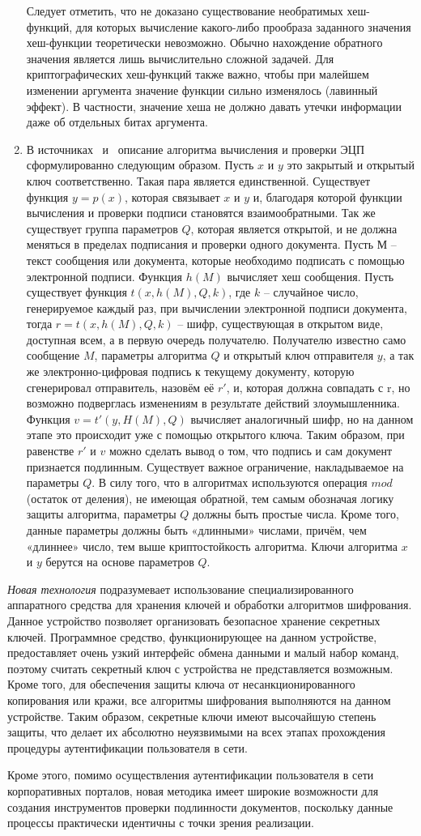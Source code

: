 \begin{enumerate}
Следует отметить, что не доказано существование необратимых хеш-функций, для
которых вычисление какого-либо прообраза заданного значения хеш-функции
теоретически невозможно. Обычно нахождение обратного значения является лишь
вычислительно сложной задачей.
Для криптографических хеш-функций также важно, чтобы при малейшем изменении
аргумента значение функции сильно изменялось (лавинный эффект). В частности,
значение хеша не должно давать утечки информации даже об отдельных битах
аргумента.~\cite{barichev}
  \item В источниках~\cite{GOST_P341094} и~\cite{ECP} описание алгоритма
  вычисления и проверки ЭЦП сформулированно следующим образом.
Пусть $x$ и $y$ это закрытый и открытый ключ соответственно. Такая пара является
единственной. Существует функция $y=p(x)$, которая связывает $x$ и $y$ и,
благодаря которой функции вычисления и проверки подписи становятся взаимообратными. Так же
существует группа параметров $Q$, которая является открытой, и не должна
меняться в пределах подписания и проверки одного документа. Пусть М -- текст
сообщения или документа, которые необходимо подписать с помощью электронной
подписи. Функция $h(M)$ вычисляет хеш сообщения. Пусть существует функция $t(x,
h(M), Q, k)$, где $k$ -- случайное число, генерируемое каждый раз, при
вычислении электронной подписи документа, тогда $r = t(x, h(M), Q, k)$ -- шифр,
существующая в открытом виде, доступная всем, а в первую очередь получателю.
Получателю известно само сообщение $M$, параметры алгоритма $Q$ и открытый ключ
отправителя $y$, а так же электронно-цифровая подпись к текущему документу,
которую сгенерировал отправитель,  назовём её $r'$, и, которая должна совпадать
с r, но возможно подверглась изменениям в результате действий злоумышленника.
Функция $v=t'(y, H(M), Q)$ вычисляет аналогичный шифр, но на данном этапе это
происходит уже с помощью открытого ключа. Таким образом, при равенстве $r'$ и
$v$ можно сделать вывод о том, что подпись и сам документ признается подлинным.
Существует важное ограничение, накладываемое на параметры $Q$. В силу того, что
в алгоритмах используются операция $mod$ (остаток от деления), не имеющая
обратной, тем самым обозначая логику защиты алгоритма, параметры $Q$ должны быть простые
числа. Кроме того, данные параметры должны быть «длинными» числами, причём, чем
«длиннее» число, тем выше криптостойкость алгоритма. Ключи алгоритма $x$ и $y$
берутся на основе параметров $Q$.
  \end{enumerate}

\textit{Новая технология} подразумевает использование специализированного
аппаратного средства для хранения ключей и обработки алгоритмов шифрования.
Данное устройство позволяет организовать безопасное хранение секретных ключей.
Программное средство, функционирующее на данном устройстве, предоставляет очень
узкий интерфейс обмена данными и малый набор команд, поэтому считать секретный
ключ с устройства не представляется возможным. Кроме того, для обеспечения
защиты ключа от несанкционированного копирования или кражи,  все алгоритмы
шифрования выполняются на данном устройстве. Таким образом, секретные ключи
имеют высочайшую степень защиты, что делает их абсолютно неуязвимыми на всех
этапах прохождения процедуры аутентификации пользователя в сети.

Кроме этого, помимо осуществления аутентификации пользователя в сети
корпоративных порталов, новая методика имеет широкие возможности для создания
инструментов проверки подлинности документов, поскольку данные процессы
практически идентичны с точки зрения реализации.
